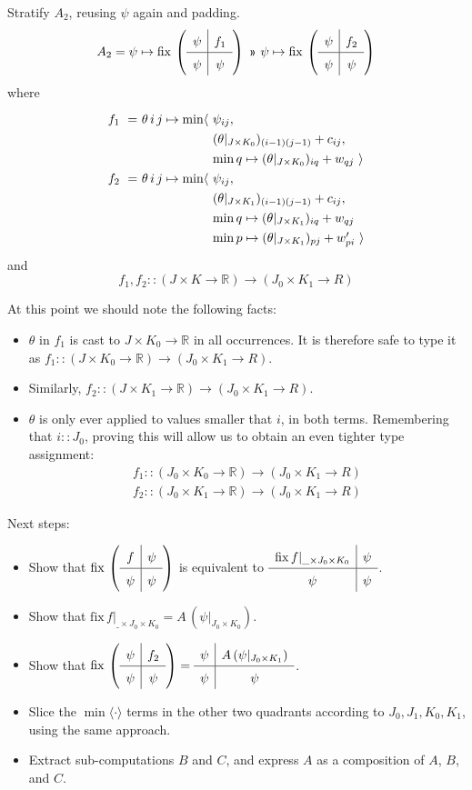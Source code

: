 \documentclass{article}
\newcommand\R{\mathbb{R}}
\begin{document}
Stratify $A_2$, reusing $\psi$ again and padding.
%
\[A_2 = \psi\mapsto\mathrm{fix}\,\left(\quadrants{\psi}{f_1}{\psi}{\psi}\right) ~\applt~
        \psi\mapsto\mathrm{fix}\,\left(\quadrants{\psi}{f_2}{\psi}{\psi}\right)
 \]
 where
 \[\renewcommand\arraystretch{1.3}
   \begin{array}{r@{}l@{}l}
   f_1 ~=~ & \theta\,i\,j \mapsto \min\langle~
        & \psi_{ij}, \\
    & & (\theta|_{J\times K_0})_{(i-1)(j-1)} + c_{ij}, \\
    & & \min q\mapsto (\theta|_{J\times K_0})_{iq} + w_{qj}~\rangle \\
    f_2 ~=~ & \theta\,i\,j \mapsto\min\langle~
        & \psi_{ij}, \\
    & & (\theta|_{J\times K_1})_{(i-1)(j-1)} + c_{ij}, \\
    & & \min q\mapsto (\theta|_{J\times K_1})_{iq} + w_{qj} \\
    & & \min p\mapsto (\theta|_{J\times K_1})_{pj} + w'_{pi}~\rangle
 \end{array}
 \]
%
and \[f_1,f_2 :: (J\times K\to\R) \to (J_0\times K_1\to R)\]

\bigskip
At this point we should note the following facts:
\begin{itemize}
  \item $\theta$ in $f_1$ is cast to $J\times K_0\to\R$ in all occurrences. 
   It is therefore safe to type it as $f_1 :: (J\times K_0\to\R) \to (J_0\times K_1\to R)$.
  \item Similarly, $f_2 :: (J\times K_1\to\R) \to (J_0\times K_1\to R)$.
  \item $\theta$ is only ever applied to values smaller that $i$, in both terms. Remembering that $i :: J_0$,
    proving this will allow us to obtain an even tighter type assignment:
    \[\renewcommand\arraystretch{1.5}
      \begin{array}{l}
       f_1 :: (J_0\times K_0\to\R) \to (J_0\times K_1\to R) \\
       f_2 :: (J_0\times K_1\to\R) \to (J_0\times K_1\to R)
      \end{array}\]
\end{itemize}

\bigskip
Next steps:
\begin{itemize}
  \item Show that $\mathrm{fix}\,\left(\quadrants{f}{\psi}{\psi}{\psi}\right)$
    is equivalent to $\quadrants{\mathrm{fix}\,f|_{\_\times J_0\times K_0}}{\psi}{\psi}{\psi}$.
  \item Show that $\mathrm{fix}\,f|_{\_\times J_0\times K_0} = A\,(\psi|_{J_0\times K_0})$.
  \item Show that $\mathrm{fix}\,\left(\quadrants{\psi}{f_2}{\psi}{\psi}\right) = 
                   \quadrants{\psi}{A\,(\psi|_{J_0\times K_1})}{\psi}{\psi}$.
  \item Slice the $\min\langle\cdot\rangle$ terms in the other two quadrants
    according to $J_0,J_1,K_0,K_1$, using the same approach.
  \item Extract sub-computations $B$ and $C$, and express $A$ as a composition of $A$, $B$, and $C$.
\end{itemize}



\end{document}
